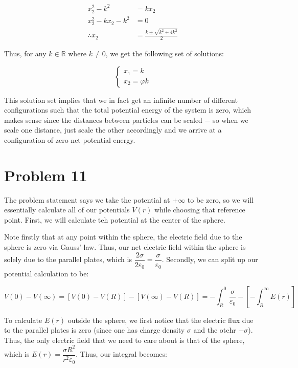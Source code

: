 \documentclass{article}
\theoremstyle{definition}
\numberwithin{equation}{section}
\numberwithin{definition}{section}
\begin{document}
    \begin{align*}
        x_2^2 - k^2 &= kx_2\\
        x_2^2 - kx_2 - k^2 &= 0\\
        \therefore x_2 &= \frac{k \pm \sqrt{k^2 + 4k^2}}{2}
    \end{align*}

    Thus, for any $k \in \mathbb{R}$ where $k \neq 0$, we get the following set of solutions:

    \[\begin{cases}
        x_1 = k\\
        x_2 = \varphi k
    \end{cases}\]

    This solution set implies that we in fact get an infinite number of different configurations such that the total potential energy of the system is zero, which makes sense since the distances between particles can be scaled $-$ so when we scale one distance, just scale the other accordingly and we arrive at a configuration of zero net potential energy.

    \section{Problem 11}

    The problem statement says we take the potential at $+ \infty$ to be zero, so we will essentially calculate all of our potentials $V(r)$ while choosing that reference point. First, we will calculate teh potential at the center of the sphere. 

    \medskip

    Note firstly that at any point within the sphere, the electric field due to the sphere is zero via Gauss' law. Thus, our net electric field within the sphere is solely due to the parallel plates, which is $\dfrac{2\sigma}{2\varepsilon_0} = \dfrac{\sigma}{\varepsilon_0}$. Secondly, we can split up our potential calculation to be:

    \[ V(0) - V(\infty) = [V(0) - V(R)] - [V(\infty) - V(R)] = -\int_R^0 \frac{\sigma}{\varepsilon_0} - \left[ -\int_R^\infty E(r)\right]\]

    To calculate $E(r)$ outside the sphere, we first notice that the electric flux due to the parallel plates is zero (since one has charge density $\sigma$ and the otehr $-\sigma$). Thus, the only electric field that we need to care about is that of the sphere, which is $E(r) = \dfrac{\sigma R^2}{r^2 \varepsilon_0}$. Thus, our integral becomes:
\end{document}
